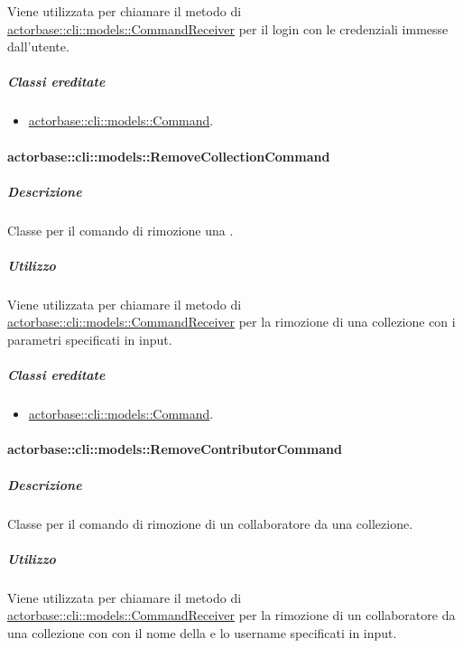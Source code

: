 \documentclass{scalatekids-article}
\begin{document}
Viene utilizzata per chiamare il metodo di
\hyperref[sec:actorbase::cli::models::CommandReceiver]{actorbase::cli::models::CommandReceiver} per il login con le credenziali
immesse dall'utente.

\subparagraph{Classi ereditate}

\begin{itemize}
\item \hyperref[sec:actorbase::cli::models::Command]{actorbase::cli::models::Command}.
\end{itemize}

\paragraph{actorbase::cli::models::RemoveCollectionCommand}
\label{sec:actorbase::cli::models::RemoveCollectionCommand}

\subparagraph{Descrizione}

Classe per il comando di rimozione una .

\subparagraph{Utilizzo}

Viene utilizzata per chiamare il metodo di
\hyperref[sec:actorbase::cli::models::CommandReceiver]{actorbase::cli::models::CommandReceiver} per la rimozione di una collezione con
i parametri specificati in input.

\subparagraph{Classi ereditate}

\begin{itemize}
\item \hyperref[sec:actorbase::cli::models::Command]{actorbase::cli::models::Command}.
\end{itemize}

\paragraph{actorbase::cli::models::RemoveContributorCommand}
\label{sec:actorbase::cli::models::RemoveContributorCommand}

\subparagraph{Descrizione}

Classe per il comando di rimozione di un collaboratore da una collezione.

\subparagraph{Utilizzo}

Viene utilizzata per chiamare il metodo di
\hyperref[sec:actorbase::cli::models::CommandReceiver]{actorbase::cli::models::CommandReceiver} per la rimozione di un collaboratore
da una collezione con con il nome della  e lo username
specificati in input.
\end{document}
